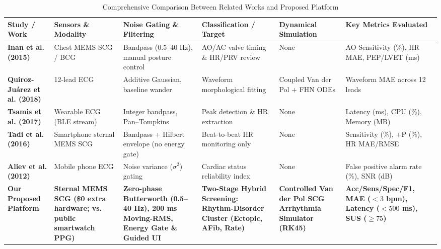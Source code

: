 \begin{table}[!ht]
\footnotesize
\sloppy
\centering
\caption{Comprehensive Comparison Between Related Works and Proposed Platform}
\label{tab:literature_comparison}
\begin{tabular}{|p{2.3cm}|p{2.1cm}|p{2.1cm}|p{2.2cm}|p{2.1cm}|p{2.2cm}|}
\hline
\textbf{Study / Work} & \textbf{Sensors \& Modality} & \textbf{Noise Gating \& Filtering} & \textbf{Classification / Target} & \textbf{Dynamical Simulation} & \textbf{Key Metrics Evaluated} \\ \hline
\textbf{Inan et al. (2015) \cite{inan2015ballistocardiography}} & Chest MEMS SCG / BCG & Bandpass ($0.5\text{--}40\text{ Hz}$), manual posture control & AO/AC valve timing \& HR/PRV review & None & AO Sensitivity (\%), HR MAE, PEP/LVET (ms) \\ \hline
\textbf{Quiroz-Ju{\'a}rez et al. (2018) \cite{quiroz2018cardiac}} & 12-lead ECG & Additive Gaussian, baseline wander & Waveform morphological fitting & Coupled Van der Pol + FHN ODEs & Waveform MAE across 12 leads \\ \hline
\textbf{Tsamis et al. (2017) \cite{tsamis2017soft}} & Wearable ECG (BLE stream) & Integer bandpass, Pan--Tompkins & Peak detection \& HR extraction & None & Latency (ms), CPU (\%), Memory (MB) \\ \hline
\textbf{Tadi et al. (2016) \cite{tadi2016realtime}} & Smartphone sternal MEMS SCG & Bandpass + Hilbert envelope (no energy gate) & Beat-to-beat HR monitoring only & None & Sensitivity (\%), $+$P (\%), HR MAE/RMSE \\ \hline
\textbf{Aliev et al. (2012) \cite{aliev2012monitoring}} & Mobile phone ECG & Noise variance ($\sigma^2$) gating & Cardiac status reliability index & None & False positive alarm rate (\%), SNR (dB) \\ \hline
\textbf{Our Proposed Platform} & \textbf{Sternal MEMS SCG (\$0 extra hardware; vs. public smartwatch PPG)} & \textbf{Zero-phase Butterworth (0.5--40 Hz), 200 ms Moving-RMS, Energy Gate \& Guided UI} & \textbf{Two-Stage Hybrid Screening: Rhythm-Disorder Cluster (Ectopic, AFib, Rate)} & \textbf{Controlled Van der Pol SCG Arrhythmia Simulator (RK45)} & \textbf{Acc/Sens/Spec/F1, MAE ($<3$ bpm), Latency ($<500$ ms), SUS ($\ge 75$)} \\ \hline
\end{tabular}
\end{table}

